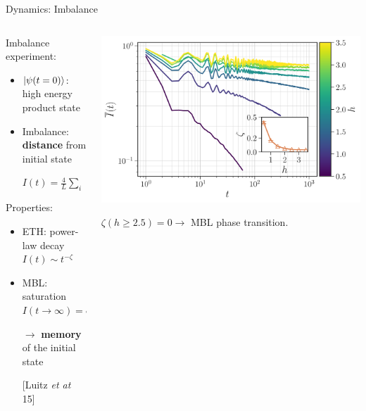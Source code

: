 \begin{frame}{Dynamics: Imbalance}
\begin{columns}
\begin{column}{0.5\textwidth}
Imbalance experiment:
\begin{itemize}
	\item $\ket{\psi(t=0)}$: high energy product state
	\item Imbalance: \textbf{distance} from initial state
	
	$I(t) = \frac{4}{L}\sum_i \left\langle \left(n_i(t) - \frac{1}{2}\right)\left(n_i(0) - \frac{1}{2}\right) \right\rangle$
\end{itemize}

Properties:
\begin{itemize}
	\item \textcolor{comp}{ETH: power-law decay} $I(t) \sim t^{-\zeta}$
	\item \textcolor{BostonBlue}{MBL: saturation} $I(t\to \infty) = \text{cst} > 0$ 
	
	$\to$ \textbf{memory} of the initial state
	
	{\footnotesize [Luitz \emph{et at} 15]}
\end{itemize}
\end{column}
\begin{column}{0.5\textwidth}
\centering
\includegraphics[width=\textwidth]{img/3_Fibonacci/imbalance}

$\zeta(h \geq 2.5) = 0 \to$ MBL phase transition.
\end{column}
\end{columns}
\end{frame}

